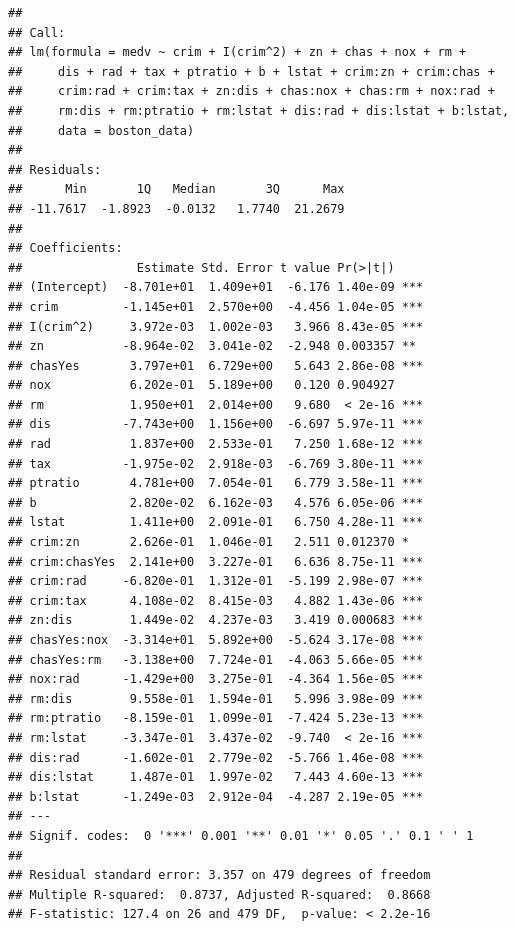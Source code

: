 \documentclass[
]{article}
\begin{document}
\begin{verbatim}
## 
## Call:
## lm(formula = medv ~ crim + I(crim^2) + zn + chas + nox + rm + 
##     dis + rad + tax + ptratio + b + lstat + crim:zn + crim:chas + 
##     crim:rad + crim:tax + zn:dis + chas:nox + chas:rm + nox:rad + 
##     rm:dis + rm:ptratio + rm:lstat + dis:rad + dis:lstat + b:lstat, 
##     data = boston_data)
## 
## Residuals:
##      Min       1Q   Median       3Q      Max 
## -11.7617  -1.8923  -0.0132   1.7740  21.2679 
## 
## Coefficients:
##                Estimate Std. Error t value Pr(>|t|)    
## (Intercept)  -8.701e+01  1.409e+01  -6.176 1.40e-09 ***
## crim         -1.145e+01  2.570e+00  -4.456 1.04e-05 ***
## I(crim^2)     3.972e-03  1.002e-03   3.966 8.43e-05 ***
## zn           -8.964e-02  3.041e-02  -2.948 0.003357 ** 
## chasYes       3.797e+01  6.729e+00   5.643 2.86e-08 ***
## nox           6.202e-01  5.189e+00   0.120 0.904927    
## rm            1.950e+01  2.014e+00   9.680  < 2e-16 ***
## dis          -7.743e+00  1.156e+00  -6.697 5.97e-11 ***
## rad           1.837e+00  2.533e-01   7.250 1.68e-12 ***
## tax          -1.975e-02  2.918e-03  -6.769 3.80e-11 ***
## ptratio       4.781e+00  7.054e-01   6.779 3.58e-11 ***
## b             2.820e-02  6.162e-03   4.576 6.05e-06 ***
## lstat         1.411e+00  2.091e-01   6.750 4.28e-11 ***
## crim:zn       2.626e-01  1.046e-01   2.511 0.012370 *  
## crim:chasYes  2.141e+00  3.227e-01   6.636 8.75e-11 ***
## crim:rad     -6.820e-01  1.312e-01  -5.199 2.98e-07 ***
## crim:tax      4.108e-02  8.415e-03   4.882 1.43e-06 ***
## zn:dis        1.449e-02  4.237e-03   3.419 0.000683 ***
## chasYes:nox  -3.314e+01  5.892e+00  -5.624 3.17e-08 ***
## chasYes:rm   -3.138e+00  7.724e-01  -4.063 5.66e-05 ***
## nox:rad      -1.429e+00  3.275e-01  -4.364 1.56e-05 ***
## rm:dis        9.558e-01  1.594e-01   5.996 3.98e-09 ***
## rm:ptratio   -8.159e-01  1.099e-01  -7.424 5.23e-13 ***
## rm:lstat     -3.347e-01  3.437e-02  -9.740  < 2e-16 ***
## dis:rad      -1.602e-01  2.779e-02  -5.766 1.46e-08 ***
## dis:lstat     1.487e-01  1.997e-02   7.443 4.60e-13 ***
## b:lstat      -1.249e-03  2.912e-04  -4.287 2.19e-05 ***
## ---
## Signif. codes:  0 '***' 0.001 '**' 0.01 '*' 0.05 '.' 0.1 ' ' 1
## 
## Residual standard error: 3.357 on 479 degrees of freedom
## Multiple R-squared:  0.8737, Adjusted R-squared:  0.8668 
## F-statistic: 127.4 on 26 and 479 DF,  p-value: < 2.2e-16
\end{verbatim}
\end{document}
